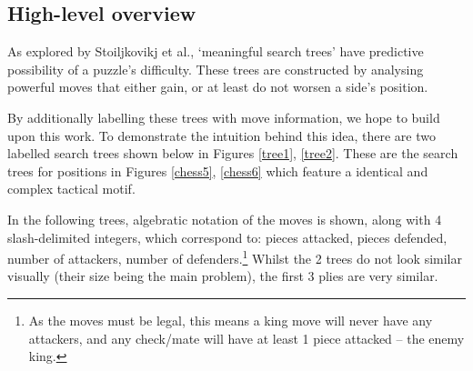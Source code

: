 \subsection{High-level overview}

As explored by Stoiljkovikj et al.\@, `meaningful search trees' have predictive
possibility of a puzzle's difficulty.\cite{chessTrees} These trees are
constructed by analysing powerful moves that either gain, or at least do not
worsen a side's position. 

By additionally labelling these trees with move information, we hope to build
upon this work. To demonstrate the intuition behind this idea, there are two
labelled search trees shown below in Figures \ref{tree1}, \ref{tree2}. These
are the search trees for positions in Figures \ref{chess5}, \ref{chess6} which
feature a identical and complex tactical motif. 

In the following trees, algebratic notation of the moves is shown, along with 4
slash-delimited integers, which correspond to: pieces attacked, pieces
defended, number of attackers, number of defenders.\footnote{As the moves must
be legal, this means a king move will never have any attackers, and any
check/mate will have at least 1 piece attacked -- the enemy king.} Whilst the 2
trees do not look similar visually (their size being the main problem), the
first 3 plies are very similar. 

